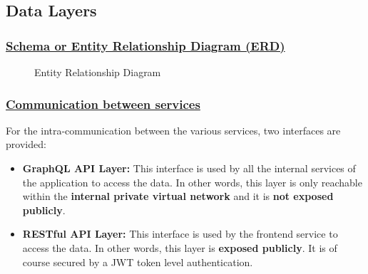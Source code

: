 \newpage

\subsection{Data Layers}
\subsubsection*{\underline{Schema or Entity Relationship Diagram (ERD)}}
\begin{figure}[H]
	\centering
	\caption{Entity Relationship Diagram}
	\label{fig:entity-relationship-diagram}
\end{figure}
\newpage

\subsubsection*{\underline{Communication between services}}
For the intra-communication between the various services, two interfaces are provided:
\begin{itemize}
	\item \textbf{GraphQL API Layer:}
	      This interface is used by all the internal services of the application to access the data.
	      In other words, this layer is only reachable within the \textbf{internal private virtual network} and it is \textbf{not exposed publicly}.
	\item \textbf{RESTful API Layer:}
	      This interface is used by the frontend service to access the data. In other words, this layer is \textbf{exposed publicly}.
	      It is of course secured by a JWT token level authentication.
\end{itemize}

